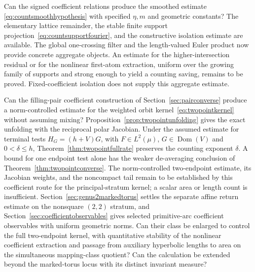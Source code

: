 \begin{question}
Can the signed coefficient relations produce the smoothed estimate
\eqref{eq:countsmoothhypothesis} with specified $\eta,m$ and geometric
constants? The elementary lattice remainder, the stable finite support
projection~\eqref{eq:countsupportfourier}, and the constructive isolation
estimate are available. The global one-crossing filter and the
length-valued Euler product now provide concrete aggregate objects.
An estimate for the higher-intersection residual or for the nonlinear
first-atom extraction, uniform over the growing family of supports and
strong enough to yield a counting saving, remains to be proved.
Fixed-coefficient isolation does not supply this aggregate estimate.
\end{question}

\begin{question}
Can the filling-pair coefficient construction of
Section~\ref{sec:pairconverse} produce a norm-controlled estimate
for the weighted orbit kernel~\eqref{eq:twopointkernel} without
assuming mixing? Proposition~\ref{prop:twopointunfolding} gives the
exact unfolding with the reciprocal polar Jacobian. Under the assumed
estimate for terminal tests $H_G=(h+V)G$, with $F\in L^2(\mu)$,
$G\in\operatorname{Dom}(V)$ and $0<\delta\le h$,
Theorem~\ref{thm:twopointfullrate} preserves
the counting exponent $\delta$. A bound for one endpoint test alone
has the weaker de-averaging conclusion of
Theorem~\ref{thm:twopointconverse}. The norm-controlled two-endpoint
estimate, its Jacobian weights, and the noncompact tail remain to be
established by this coefficient route for the principal-stratum kernel;
a scalar area or length count is insufficient.
Section~\ref{sec:genus2markedtorus}
settles the separate affine return estimate on the nonsquare $(2,2)$
stratum, and Section~\ref{sec:coefficientobservables} gives selected
primitive-arc coefficient observables with uniform geometric norms.
Can their class be enlarged to control the full two-endpoint kernel,
with quantitative stability of the nonlinear coefficient extraction
and passage from auxiliary hyperbolic lengths to area on the
simultaneous mapping-class quotient? Can the calculation be extended
beyond the marked-torus locus with its distinct invariant measure?
\end{question}


